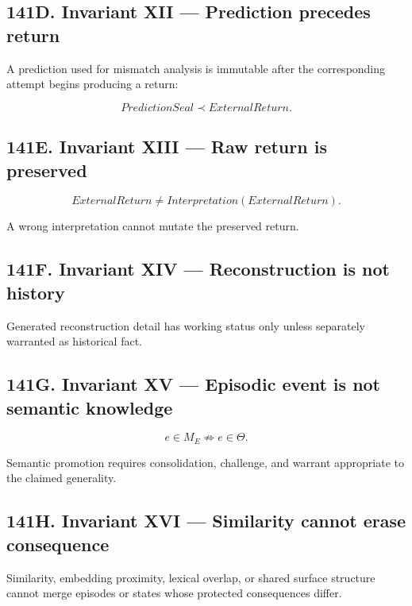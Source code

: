 \documentclass[
]{article}
\begin{document}
\subsection{141D. Invariant XII --- Prediction precedes return}\label{invariant-xii-prediction-precedes-return}

A prediction used for mismatch analysis is immutable after the corresponding
attempt begins producing a return:

\[
\boxed{
PredictionSeal\prec ExternalReturn.
}
\]

\subsection{141E. Invariant XIII --- Raw return is preserved}\label{invariant-xiii-raw-return-preserved}

\[
\boxed{
ExternalReturn\neq Interpretation(ExternalReturn).
}
\]

A wrong interpretation cannot mutate the preserved return.

\subsection{141F. Invariant XIV --- Reconstruction is not history}\label{invariant-xiv-reconstruction-is-not-history}

Generated reconstruction detail has working status only unless separately
warranted as historical fact.

\subsection{141G. Invariant XV --- Episodic event is not semantic knowledge}\label{invariant-xv-episodic-not-semantic}

\[
\boxed{
e\in M_E\not\Rightarrow e\in\Theta.
}
\]

Semantic promotion requires consolidation, challenge, and warrant appropriate
to the claimed generality.

\subsection{141H. Invariant XVI --- Similarity cannot erase consequence}\label{invariant-xvi-similarity-cannot-erase-consequence}

Similarity, embedding proximity, lexical overlap, or shared surface structure
cannot merge episodes or states whose protected consequences differ.
\end{document}
